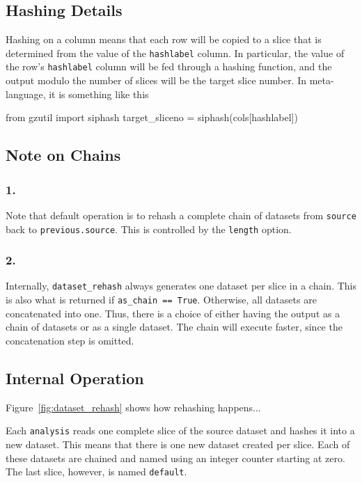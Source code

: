 \subsection{Hashing Details}
Hashing on a column means that each row will be copied to a slice that
is determined from the value of the \texttt{hashlabel} column.  In
particular, the value of the row's \texttt{hashlabel} column will be
fed through a hashing function, and the output modulo the number of
slices will be the target slice number.  In meta-language, it is
something like this
\\
\begin{python}
from gzutil import siphash
target_sliceno = siphash(cols[hashlabel])
\end{python}


\subsection{Note on Chains}
\subsubsection{1.}
Note that default operation is to rehash a complete chain of datasets
from \texttt{source} back to \texttt{previous.source}.  This is
controlled by the \texttt{length} option.

\subsubsection{2.}
Internally, \texttt{dataset\_rehash} always generates one dataset per
slice in a chain.  This is also what is returned if \texttt{as\_chain
  == True}.  Otherwise, all datasets are concatenated into one.  Thus,
there is a choice of either having the output as a chain of datasets
or as a single dataset.  The chain will execute faster, since the
concatenation step is omitted.


\clearpage
\subsection{Internal Operation}
Figure~\ref{fig:dataset_rehash} shows how rehashing happens...

Each \texttt{analysis} reads one complete slice of the source dataset
and hashes it into a new dataset.  This means that there is one new
dataset created per slice.  Each of these datasets are chained and
named using an integer counter starting at zero.  The last slice,
however, is named \texttt{default}.

